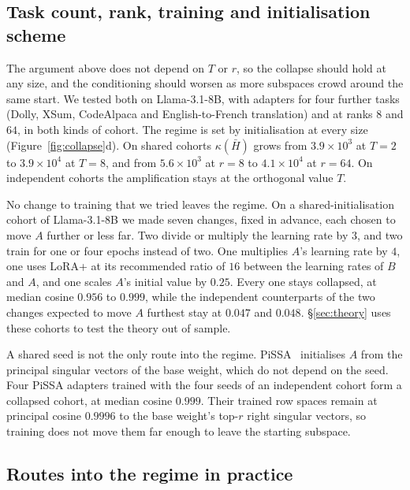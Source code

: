\subsection{Task count, rank, training and initialisation scheme}\label{subsec:tr}

The argument above does not depend on $T$ or $r$, so the collapse should
hold at any size, and the conditioning should worsen as more subspaces crowd
around the same start. We tested both on Llama-3.1-8B, with adapters for four
further tasks (Dolly, XSum, CodeAlpaca and English-to-French translation) and
at ranks $8$ and $64$, in both kinds of cohort. The regime is set by initialisation at
every size (Figure~\ref{fig:collapse}d). On shared cohorts $\kappa(\bar H)$
grows from $3.9\times10^{3}$ at $T = 2$ to $3.9\times10^{4}$ at $T = 8$, and
from $5.6\times10^{3}$ at $r = 8$ to $4.1\times10^{4}$ at $r = 64$. On
independent cohorts the amplification stays at the orthogonal value $T$.

No change to training that we tried leaves the regime. On a
shared-initialisation cohort of Llama-3.1-8B we made seven changes, fixed in
advance, each chosen to move $A$ further or less far. Two divide or multiply
the learning rate by $3$, and two train for one or four epochs instead of
two. One multiplies $A$'s learning rate by $4$, one uses LoRA+ at its
recommended ratio of $16$ between the learning rates of $B$ and $A$, and one
scales $A$'s initial value by $0.25$. Every one stays
collapsed, at median cosine $0.956$ to $0.999$, while the independent
counterparts of the two changes expected to move $A$ furthest stay at $0.047$
and $0.048$. \S\ref{sec:theory} uses these cohorts to test the theory out of
sample.

A shared seed is not the only route into the regime.
PiSSA~\citep{meng2024pissa} initialises $A$ from the principal singular
vectors of the base weight, which do not depend on the seed. Four PiSSA
adapters trained with the four seeds of an independent cohort form a collapsed
cohort, at median cosine $0.999$. Their trained row spaces remain at principal
cosine $0.9996$ to the base weight's top-$r$ right singular vectors, so
training does not move them far enough to leave the starting subspace.

\subsection{Routes into the regime in practice}\label{subsec:routes}

